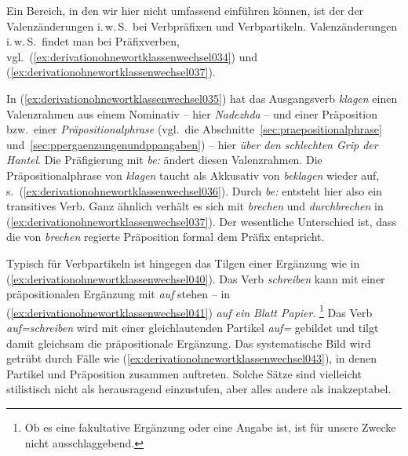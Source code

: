 Ein Bereich, in den wir hier nicht umfassend einführen können, ist der der Valenzänderungen i.\,w.\,S.\ bei Verbpräfixen und Verbpartikeln.
Valenzänderungen i.\,w.\,S.\ findet man bei Präfixverben, vgl.\ (\ref{ex:derivationohnewortklassenwechsel034}) und (\ref{ex:derivationohnewortklassenwechsel037}).

\begin{exe}
  \ex \label{ex:derivationohnewortklassenwechsel034}
  \begin{xlist}
  \end{xlist}
  \ex \label{ex:derivationohnewortklassenwechsel037}
  \begin{xlist}
  \end{xlist}
\end{exe}

In (\ref{ex:derivationohnewortklassenwechsel035}) hat das Ausgangsverb \textit{klagen} einen Valenzrahmen aus einem Nominativ -- hier \textit{Nadezhda} -- und einer Präposition bzw.\ einer \textit{Präpositionalphrase} (vgl.\ die Abschnitte~\ref{sec:praepositionalphrase} und~\ref{sec:ppergaenzungenundppangaben}) -- hier \textit{über den schlechten Grip der Hantel}.
Die Präfigierung mit \textit{be:} ändert diesen Valenzrahmen.
Die Präpositionalphrase von \textit{klagen} taucht als Akkusativ von \textit{beklagen} wieder auf, s.\ (\ref{ex:derivationohnewortklassenwechsel036}).
Durch \textit{be:} entsteht hier also ein transitives Verb.
Ganz ähnlich verhält es sich mit \textit{brechen} und \textit{durchbrechen} in (\ref{ex:derivationohnewortklassenwechsel037}).
Der wesentliche Unterschied ist, dass die von \textit{brechen} regierte Präposition formal dem Präfix entspricht.

Typisch für Verbpartikeln ist hingegen das Tilgen einer Ergänzung wie in (\ref{ex:derivationohnewortklassenwechsel040}).
Das Verb \textit{schreiben} kann mit einer präpositionalen Ergänzung mit \textit{auf} stehen -- in (\ref{ex:derivationohnewortklassenwechsel041}) \textit{auf ein Blatt Papier}.%
\footnote{Ob es eine fakultative Ergänzung oder eine Angabe ist, ist für unsere Zwecke nicht ausschlaggebend.}
Das Verb \textit{auf=schreiben} wird mit einer gleichlautenden Partikel \textit{auf=} gebildet und tilgt damit gleichsam die präpositionale Ergänzung.
Das systematische Bild wird getrübt durch Fälle wie (\ref{ex:derivationohnewortklassenwechsel043}), in denen Partikel und Präposition zusammen auftreten.
Solche Sätze sind vielleicht stilistisch nicht als herausragend einzustufen, aber alles andere als inakzeptabel.

